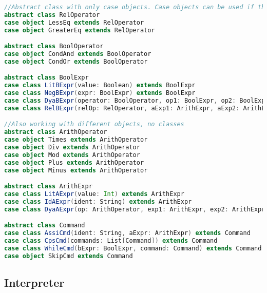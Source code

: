\begin{lstlisting}[language=Scala]
//Abstract class with only case objects. Case objects can be used if there are cases which take no parameter.
abstract class RelOperator
case object LessEq extends RelOperator
case object GreaterEq extends RelOperator

abstract class BoolOperator 
case object CondAnd extends BoolOperator 
case object CondOr extends BoolOperator 

abstract class BoolExpr
case class LitBExpr(value: Boolean) extends BoolExpr
case class NegBExpr(expr: BoolExpr) extends BoolExpr
case class DyaBExpr(operator: BoolOperator, op1: BoolExpr, op2: BoolExpr) extends BoolExpr // dyadic, means two
case class RelBExpr(relOp: RelOperator, aExp1: ArithExpr, aExp2: ArithExpr) extends BoolExpr

//Also working with different objects, no classes
abstract class ArithOperator
case object Times extends ArithOperator
case object Div extends ArithOperator
case object Mod extends ArithOperator
case object Plus extends ArithOperator
case object Minus extends ArithOperator

abstract class ArithExpr
case class LitAExpr(value: Int) extends ArithExpr
case class IdAExpr(ident: String) extends ArithExpr
case class DyaAExpr(op: ArithOperator, exp1: ArithExpr, exp2: ArithExpr) extends ArithExpr

abstract class Command
case class AssiCmd(ident: String, aExpr: ArithExpr) extends Command
case class CpsCmd(commands: List[Command]) extends Command
case class WhileCmd(bExpr: BoolExpr, command: Command) extends Command
case object SkipCmd extends Command
\end{lstlisting}

\subsection{Interpreter}

